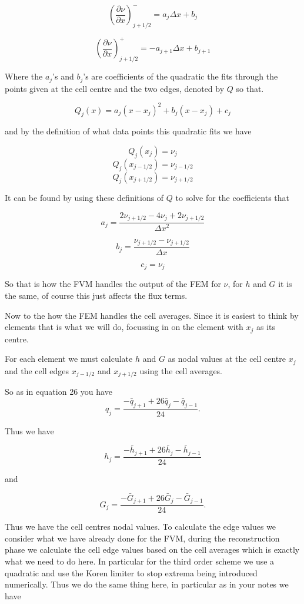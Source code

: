 \documentclass[12pt]{article}
\begin{document}
\[\left(\frac{\partial \nu}{\partial x}\right)^-_{j + 1/2} = a_j \Delta x + b_j\]

\[\left(\frac{\partial \nu}{\partial x}\right)^+_{j + 1/2} = -a_{j+1} \Delta x + b_{j+ 1}\]

Where the $a_j$'s and $b_j$'s are coefficients of the quadratic the fits through the points given at the cell centre and the two edges, denoted by $Q$ so that.

\[Q_j(x) = a_j \left(x - x_j\right)^2 + b_j \left(x - x_j\right) + c_j \]

and by the definition of what data points this quadratic fits we have

\[Q_j(x_j) = \nu_j \]
\[Q_j(x_{j - 1/2}) = \nu_{j - 1/2} \]
\[Q_j(x_{j + 1/2}) = \nu_{j + 1/2} \]

It can be found by using these definitions of $Q$ to solve for the coefficients that

\[a_j = \frac{2\nu_{j+ 1/2} - 4\nu_j + 2\nu_{j+ 1/2}}{\Delta x ^2}\]

\[b_j = \frac{\nu_{j+ 1/2} - \nu_{j+ 1/2}}{\Delta x}\]

\[c_j = \nu_j\]

So that is how the FVM handles the output of the FEM for $\nu$, for $h$ and $G$ it is the same, of course this just affects the flux terms.

Now to the how the FEM handles the cell averages. Since it is easiest to think by elements that is what we will do, focussing in on the element with $x_j$ as its centre.

For each element we must calculate $h$ and $G$ as nodal values at the cell centre $x_j$ and the cell edges $x_{j - 1/2}$ and $x_{j + 1/2}$ using the cell averages. 

So as in equation 26 you have
\[q_j = \frac{- \bar{q}_{j+1} + 26\bar{q}_{j} - \bar{q}_{j-1}}{24}.\]

Thus we have 

\[h_j = \frac{- \bar{h}_{j+1} + 26\bar{h}_{j} - \bar{h}_{j-1}}{24}\]

and 

\[G_j = \frac{- \bar{G}_{j+1} + 26\bar{G}_{j} - \bar{G}_{j-1}}{24}.\]

Thus we have the cell centres nodal values. To calculate the edge values we consider what we have already done for the FVM, during the reconstruction phase we calculate the cell edge values based on the cell averages which is exactly what we need to do here. In particular for the third order scheme we use a quadratic and use the Koren limiter to stop extrema being introduced numerically. Thus we do the same thing here, in particular as in your notes we have 
\end{document}
